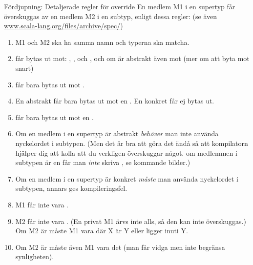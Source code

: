 \begin{Slide}{Fördjupning: Detaljerade regler för override} \SlideFontTiny
\label{slideW07:overriderules}
En medlem M1 i en supertyp får överskuggas av en medlem M2 i en subtyp, enligt dessa regler: (se även \href{https://www.scala-lang.org/files/archive/spec/3.4/05-classes-and-objects.html#overriding}{www.scala-lang.org/files/archive/spec/})
\begin{enumerate}
\item M1 och M2 ska ha samma namn och typerna ska matcha.

\item {} får bytas ut mot: , , och , och om  är abstrakt även mot  (mer om att byta  mot  snart)

\item {} får bara bytas ut mot . 
\item En abstrakt  får bara bytas ut mot en . En konkret  får ej bytas ut.
\item {} får bara bytas ut mot en .

\item Om en medlem i en supertyp är abstrakt \emph{behöver} man inte använda nyckelordet  i subtypen. (Men det är bra att göra det ändå så att kompilatorn hjälper dig att kolla att du verkligen överskuggar något.  om medlemmen i subtypen är en  får man \emph{inte} skriva , se kommande bilder.)

\item Om en medlem i en supertyp är konkret \emph{måste} man använda nyckelordet  i subtypen, annars ges kompileringsfel.
\item M1 får inte vara .
\item M2 får inte vara . (En privat M1 ärvs inte alls, så den kan inte överskuggas.) Om M2 är  måste M1 vara  där X är Y eller ligger inuti Y.
\item Om M2 är  måste även M1 vara det (man får vidga men inte begränsa synligheten).

\end{enumerate}
\end{Slide}

